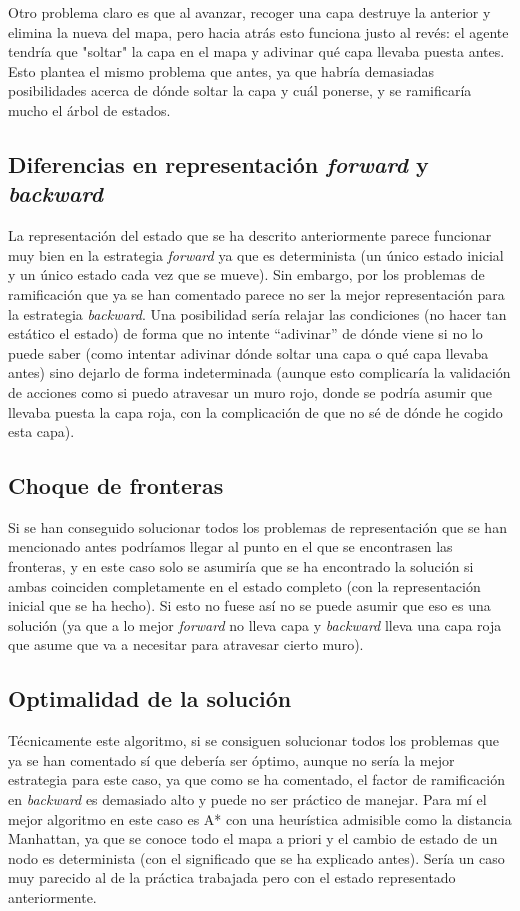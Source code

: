 \documentclass[11pt]{article}
\begin{document}
Otro problema claro es que al avanzar, recoger una capa destruye la anterior y elimina la nueva del mapa, pero hacia atrás esto funciona justo al revés: el agente tendría que "soltar" la capa en el mapa y adivinar qué capa llevaba puesta antes. Esto plantea el mismo problema que antes, ya que habría demasiadas posibilidades acerca de dónde soltar la capa y cuál ponerse, y se ramificaría mucho el árbol de estados.

\subsection{Diferencias en representación \textit{forward} y \textit{backward}}
La representación del estado que se ha descrito anteriormente parece funcionar muy bien en la estrategia \textit{forward} ya que es determinista (un único estado inicial y un único estado cada vez que se mueve). Sin embargo, por los problemas de ramificación que ya se han comentado parece no ser la mejor representación para la estrategia \textit{backward}. Una posibilidad sería relajar las condiciones (no hacer tan estático el estado) de forma que no intente ``adivinar'' de dónde viene si no lo puede saber (como intentar adivinar dónde soltar una capa o qué capa llevaba antes) sino dejarlo de forma indeterminada (aunque esto complicaría la validación de acciones como si puedo atravesar un muro rojo, donde se podría asumir que llevaba puesta la capa roja, con la complicación de que no sé de dónde he cogido esta capa).

\subsection{Choque de fronteras}
Si se han conseguido solucionar todos los problemas de representación que se han mencionado antes podríamos llegar al punto en el que se encontrasen las fronteras, y en este caso solo se asumiría que se ha encontrado la solución si ambas coinciden completamente en el estado completo (con la representación inicial que se ha hecho). Si esto no fuese así no se puede asumir que eso es una solución (ya que a lo mejor \textit{forward} no lleva capa y \textit{backward} lleva una capa roja que asume que va a necesitar para atravesar cierto muro). 

\subsection{Optimalidad de la solución}
Técnicamente este algoritmo, si se consiguen solucionar todos los problemas que ya se han comentado sí que debería ser óptimo, aunque no sería la mejor estrategia para este caso, ya que como se ha comentado, el factor de ramificación en \textit{backward} es demasiado alto y puede no ser práctico de manejar. Para mí el mejor algoritmo en este caso es A* con una heurística admisible como la distancia Manhattan, ya que se conoce todo el mapa a priori y el cambio de estado de un nodo es determinista (con el significado que se ha explicado antes). Sería un caso muy parecido al de la práctica trabajada pero con el estado representado anteriormente.
\end{document}
